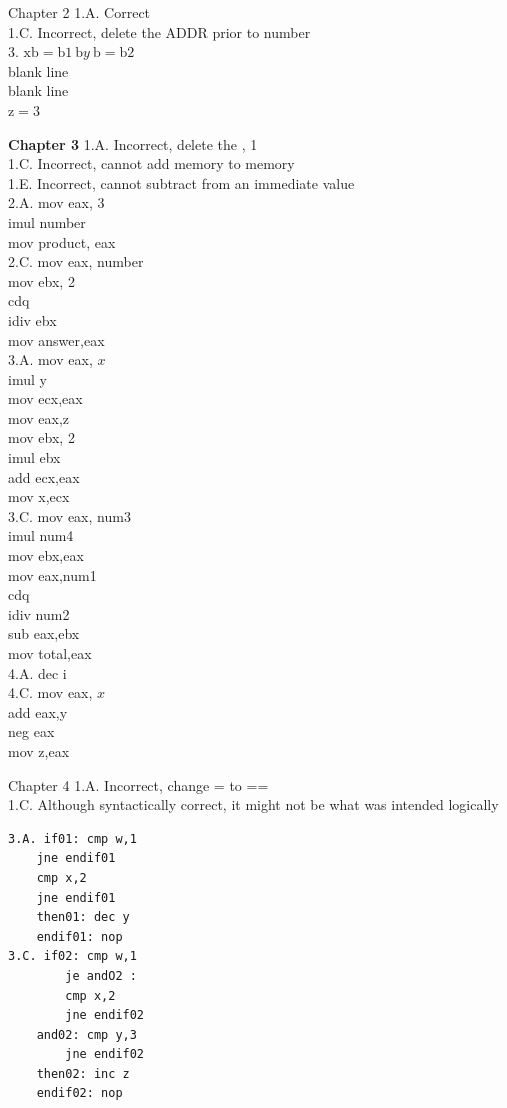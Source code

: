 \documentclass[10pt]{book}
\begin{document}
Chapter 2
1.A. Correct\\
1.C. Incorrect, delete the ADDR prior to number\\
3. $\mathrm{xb}=\mathrm{b} 1 \mathrm{~b} y \mathrm{~b}=\mathrm{b} 2$\\
blank line\\
blank line\\
$\mathrm{z}=3$

\textbf{Chapter 3}
1.A. Incorrect, delete the , 1\\
1.C. Incorrect, cannot add memory to memory\\
1.E. Incorrect, cannot subtract from an immediate value\\
2.A. mov eax, 3\\
imul number\\
mov product, eax\\
2.C. mov eax, number\\
mov ebx, 2\\
cdq\\
idiv ebx\\
mov answer,eax\\
3.A. mov eax, $x$\\
imul y\\
mov ecx,eax\\
mov eax,z\\
mov ebx, 2\\
imul ebx\\
add ecx,eax\\
mov x,ecx\\
3.C. mov eax, num3\\
imul num4\\
mov ebx,eax\\
mov eax,num1\\
cdq\\
idiv num2\\
sub eax,ebx\\
mov total,eax\\
4.A. dec i\\
4.C. mov eax, $x$\\
add eax,y\\
neg eax\\
mov z,eax

Chapter 4
1.A. Incorrect, change = to ==\\

1.C. Although syntactically correct, it might not be what was intended logically

\begin{verbatim}
3.A. if01: cmp w,1
    jne endif01
    cmp x,2
    jne endif01
    then01: dec y
    endif01: nop
3.C. if02: cmp w,1
        je andO2 :
        cmp x,2
        jne endif02
    and02: cmp y,3
        jne endif02
    then02: inc z
    endif02: nop
\end{verbatim}
\end{document}
